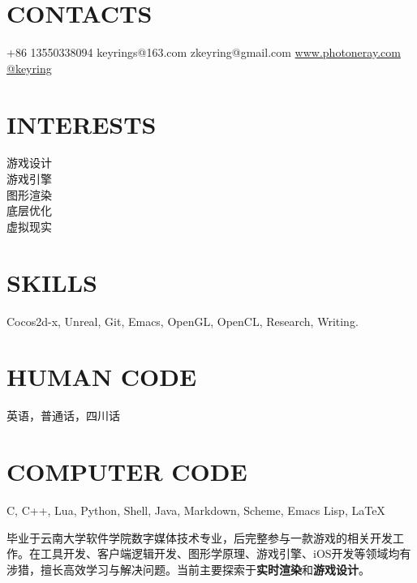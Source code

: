 \documentclass[full]{rvca_print}
\begin{document}


\begin{aside} %
\section{\uppercase{contacts}}
+86 13550338094 {\faMobile}
keyrings@163.com {\scriptsize\faLink}
zkeyring@gmail.com {\scriptsize\faLink}
\href{http://www.photoneray.com}{\color{sidebandtextcolor}www.photoneray.com \faGlobe} 
\href{https://github.com/keyring}{\color{sidebandtextcolor}@keyring \faGithub}
\ghost
\section{\uppercase{interests}}
游戏设计\\游戏引擎\\图形渲染\\底层优化\\虚拟现实
%
\ghost
\section{\uppercase{skills}}
{\scriptsize\faHeart}Cocos2d-x, Unreal, Git, Emacs, OpenGL, OpenCL, Research, Writing.
\ghost 
\section{\uppercase{human code}}
英语，普通话，四川话
\ghost
\section{\uppercase{computer code}}
{\scriptsize\faHeart}C, C++, {\scriptsize\faHeart}Lua, Python, Shell, Java, Markdown, Scheme, Emacs Lisp, \LaTeX
\ghost
\end{aside}




\begin{statement}
毕业于云南大学软件学院数字媒体技术专业，后完整参与一款游戏的相关开发工作。在工具开发、客户端逻辑开发、图形学原理、游戏引擎、iOS开发等领域均有涉猎，擅长高效学习与解决问题。当前主要探索于\textbf{实时渲染}和\textbf{游戏设计}。
\end{statement}

\subsection{}
\end{document}
